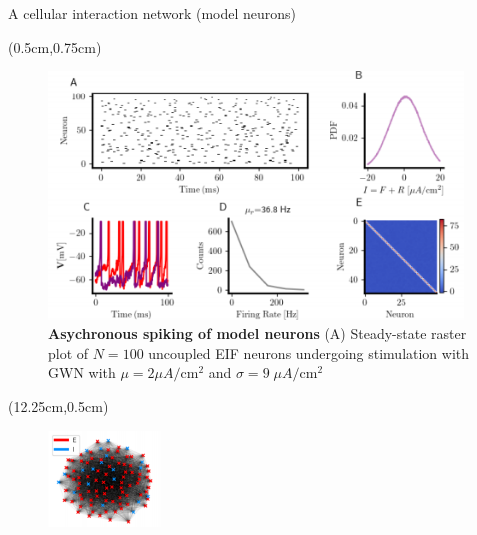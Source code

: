 \documentclass[aspectratio=1610]{beamer}					%
\begin{document}
\begin{frame}{A cellular interaction network (model neurons)}
\begin{textblock*}{12cm}(0.5cm,0.75cm)
\begin{figure}
\includegraphics[width=11cm]{neural-network.png}
\caption{\textbf{Asychronous spiking of model neurons} (A) Steady-state raster plot of $N=100$ uncoupled EIF neurons undergoing stimulation with GWN with $\mu = 2\mu A/\mathrm{cm}^{2}$ and $\sigma = 9 \;\mu A/\mathrm{cm}^{2}$}
\end{figure}
\end{textblock*}
\begin{textblock*}{3cm}(12.25cm,0.5cm)
\begin{figure}
\includegraphics[width=3cm]{neural-network-graph.png}
\end{figure}
\end{textblock*}
\end{frame}
\end{document}
